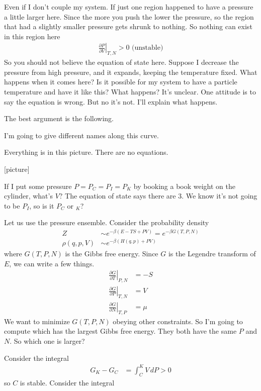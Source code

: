 Even if I don't couple my system.
If just one region happened to have a pressure a little larger here.
Since the more you push the lower the pressure,
so the region that had a slightly smaller pressure gets shrunk to nothing.
So nothing can exist in this region here
\begin{align}
    \left.
    \frac{\partial P}{\partial V}
    \right|_{T,N}
    > 0
    \text{ (unstable)}
\end{align}
So you should not believe the equation of state here.
Suppose I decrease the pressure from high pressure,
and it expands,
keeping the temperature fixed.
What happens when it comes here?
Is it possible for my system to have a particle temperature and have it like
this?
What happens?
It's unclear.
One attitude is to say the equation is wrong.
But no it's not.
I'll explain what happens.

The best argument is the following.

I'm going to give different names along this curve.

Everything is in this picture.
There are no equations.

[picture]

If I put some pressure $P=P_C=P_I=P_K$ by booking a book weight on the cylinder,
what's $V$?
The equation of state says there are 3.
We know it's not going to be $P_I$,
so is it $P_C$ or $_K$?

Let us use the pressure ensemble.
Consider the probability density
\begin{align}
    Z
    &\sim
    e^{-\beta\left( E - TS + PV \right)}
    =
    e^{-\beta G(T, P, N)}\\
    \rho\left(q, p, V \right)
    &\sim
    e^{-\beta\left( H(q,p) + PV \right)}
\end{align}
where $G(T, P, N)$ is the Gibbs free energy.
Since $G$ is the Legendre transform of $E$,
we can write a few things.
\begin{align}
    \left.
    \frac{\partial G}{\partial T}
    \right|_{P, N}
    &=
    -S\\
    \left.
    \frac{\partial G}{\partial P}
    \right|_{T,N}
    &=
    V\\
    \left.
    \frac{\partial G}{\partial N}
    \right|_{T,P}
    &=
    \mu
\end{align}
We want to minimize $G(T, P, N)$ obeying other constraints.
So I'm going to compute which has the largest Gibbs free energy.
They both have the same $P$ and $N$.
So which one is larger?

Consider the integral
\begin{align}
    G_K - G_C
    &=
    \int_{C}^{K} V\, dP > 0
\end{align}
so $C$ is stable.
Consider the integral

